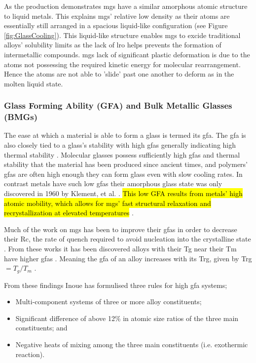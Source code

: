 \documentclass[a4paper,12pt,oneside]{report}%
\begin{document}
As the production demonstrates \glspl{mg} have a similar amorphous atomic structure to liquid metals. This explains \glspl{mg}' relative low density as their atoms are essentially still arranged in a spacious liquid-like configuration (see Figure \ref{fig:GlassCooling}). This liquid-like structure enables \glspl{mg} to excide traditional alloys' solubility limits as the lack of \gls{lro} helps prevents the formation of intermetallic compounds. \glspl{mg} lack of significant plastic deformation is due to the atoms not possessing the required kinetic energy for molecular rearrangement. Hence the atoms are not able to 'slide' past one another to deform as in the molten liquid state.

\subsubsection{Glass Forming Ability (GFA) and Bulk Metallic Glasses (BMGs)}
The ease at which a material is able to form a glass is termed its \gls{gfa}. The \gls{gfa} is also closely tied to a glass's stability with high \glspl{gfa} generally indicating high thermal stability \cite{Aji2013}. Molecular glasses possess sufficiently high \glspl{gfa} and thermal stability that the material has been produced since ancient times, and polymers' \glspl{gfa} are often high enough they can form glass even with slow cooling rates. In contrast metals have such low \glspl{gfa} their amorphous glass state was only discovered in 1960 by Klement, et al. \cite{Klement1960}. \hl{This low GFA results from metals' high atomic mobility, which allows for mgs' fast structural relaxation and recrystallization at elevated temperatures} \cite{Aji2013}. 

Much of the work on \glspl{mg} has been to improve their \glspl{gfa} in order to decrease their \gls{Rc}, the rate of quench required to avoid nucleation into the crystalline state \cite{Inoue2000}. From these works it has been discovered alloys with their \gls{Tg} near their \gls{Tm} have higher \glspl{gfa} \cite{Inoue2000, Trexler2010, Turnbull1969}. Meaning the \gls{gfa} of an alloy increases with its \gls{Trg}, given by \gls{Trg} $= T_{g}/T_{m}$ \cite{Inoue2000, Trexler2010, Turnbull1969}. 

From these findings Inoue \cite{Inoue2000} has formulised three rules for high \gls{gfa} systems;

\begin{itemize}
	\item Multi-component systems of three or more alloy constituents;
	\item Significant difference of above 12\% in atomic size ratios of the three main constituents; and
	\item Negative heats of mixing among the three main constituents (i.e. exothermic reaction). 
\end{itemize}
\end{document}
